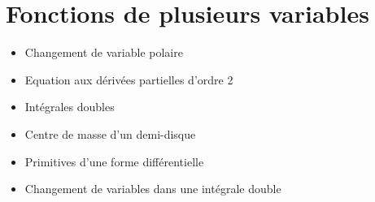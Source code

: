 \chapter{Fonctions de plusieurs variables}

\begin{itemize}
    \item Changement de variable polaire
    \item Equation aux dérivées partielles d'ordre 2
    \item Intégrales doubles
    \item Centre de masse d'un demi-disque
    \item Primitives d'une forme différentielle
    \item Changement de variables dans une intégrale double
\end{itemize}